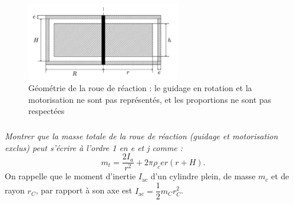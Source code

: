 \begin{figure}[!htb]
\begin{center}
\includegraphics[width=0.6\textwidth]{images/image8.jpg}
\end{center}
\caption{Géométrie de la roue de réaction : le guidage en
rotation et la motorisation ne sont pas représentés, et les proportions
ne sont pas respectées \label{fig8}}
\end{figure}
\fi



\subparagraph{\label{q_16}}\textit{ Montrer que la masse totale de la roue de réaction (guidage et
motorisation exclus) peut s'écrire à l'ordre 1 en e et j comme :}
$$
m_t=\dfrac{2 I_a}{r^2}+2\pi\rho_c e r\left(r+H\right).
$$
\ifprof
\else
  On rappelle que le moment d'inertie $I_{\text{ac}}$ d'un cylindre plein, de masse $m_c$ et
  de rayon $r_C$, par rapport à son axe est $I_{\text{ac}}=\dfrac{1}{2}m_Cr_C^2$.
\fi

